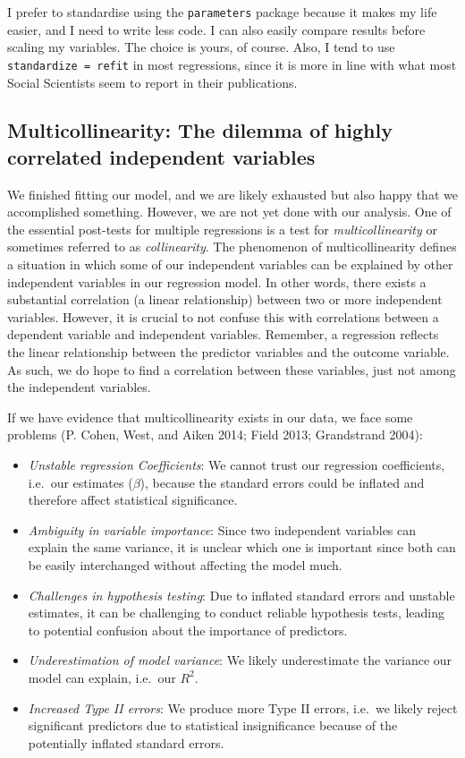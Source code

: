 \documentclass[
  letterpaper,
]{krantz}
\begin{document}
I prefer to standardise using the \texttt{parameters} package because it
makes my life easier, and I need to write less code. I can also easily
compare results before scaling my variables. The choice is yours, of
course. Also, I tend to use \texttt{standardize\ =\ refit} in most
regressions, since it is more in line with what most Social Scientists
seem to report in their publications.

\subsection{Multicollinearity: The dilemma of highly correlated
independent variables}\label{sec-multicollinearity}

We finished fitting our model, and we are likely exhausted but also
happy that we accomplished something. However, we are not yet done with
our analysis. One of the essential post-tests for multiple regressions
is a test for \emph{multicollinearity} or sometimes referred to as
\emph{collinearity}. The phenomenon of multicollinearity defines a
situation in which some of our independent variables can be explained by
other independent variables in our regression model. In other words,
there exists a substantial correlation (a linear relationship) between
two or more independent variables. However, it is crucial to not confuse
this with correlations between a dependent variable and independent
variables. Remember, a regression reflects the linear relationship
between the predictor variables and the outcome variable. As such, we do
hope to find a correlation between these variables, just not among the
independent variables.

If we have evidence that multicollinearity exists in our data, we face
some problems (P. Cohen, West, and Aiken 2014; Field 2013; Grandstrand
2004):

\begin{itemize}
\item
  \emph{Unstable regression Coefficients}: We cannot trust our
  regression coefficients, i.e.~our estimates (\(\beta\)), because the
  standard errors could be inflated and therefore affect statistical
  significance.
\item
  \emph{Ambiguity in variable importance}: Since two independent
  variables can explain the same variance, it is unclear which one is
  important since both can be easily interchanged without affecting the
  model much.
\item
  \emph{Challenges in hypothesis testing}: Due to inflated standard
  errors and unstable estimates, it can be challenging to conduct
  reliable hypothesis tests, leading to potential confusion about the
  importance of predictors.
\item
  \emph{Underestimation of model variance}: We likely underestimate the
  variance our model can explain, i.e.~our \(R^2\).
\item
  \emph{Increased Type II errors}: We produce more Type II errors,
  i.e.~we likely reject significant predictors due to statistical
  insignificance because of the potentially inflated standard errors.
\end{itemize}
\end{document}
